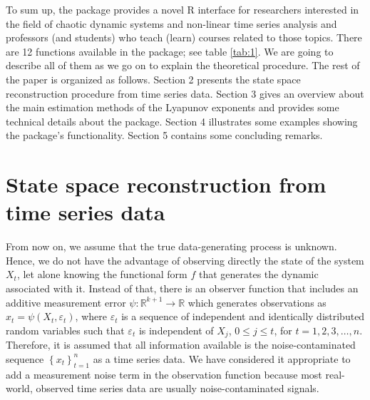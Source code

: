 To sum up, the  package provides a novel R interface for researchers interested in the field of chaotic dynamic systems and non-linear time series analysis and professors (and students) who teach (learn) courses related to those topics. There are 12 functions available in the  package; see table \ref{tab:1}. We are going to describe all of them as we go on to explain the theoretical procedure. The rest of the paper is organized as follows. Section 2 presents the state space reconstruction procedure from time series data. Section 3 gives an overview about the main estimation methods of the Lyapunov exponents and provides some technical details about the  package. Section 4 illustrates some examples showing the package's functionality. Section 5 contains some concluding remarks.


\section{State space reconstruction from time series data}

From now on, we assume that the true data-generating process is unknown. Hence, we do not have the advantage of observing directly the state of the system ${{X_t}}$, let alone knowing the functional form $f$ that generates the dynamic associated with it. Instead of that, there is an observer function that includes an additive measurement error $\psi :{\mathbb{R}^{k+1}} \to \mathbb{R}$ which generates observations as ${x_t} = \psi \left( {{X_t}}, \varepsilon_{t} \right)$, where $\varepsilon _{t}$ is a sequence of independent and identically distributed random variables such that $\varepsilon _{t}$ is independent of ${X_j}$, $0 \leqslant j \leqslant t$, for $t = 1,2,3, \ldots ,n$. Therefore, it is assumed that all information available is the noise-contaminated sequence $\left\{ {{x_t}} \right\}_{t = 1}^n$ as a time series data. We have considered it appropriate to add a measurement noise term in the observation function because most real-world, observed time series data are usually noise-contaminated signals. 

